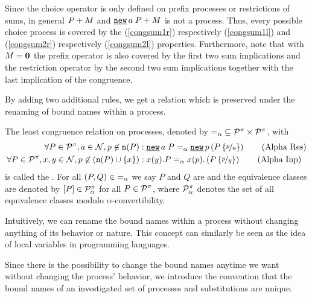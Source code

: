 Since the choice operator is only defined on prefix processes or restrictions of sums, in general $P + M$ and $\procchoice{\procres{a}{P}}{M}$ is not a process. Thus, every possible choice process is covered by the (\ref{congsum1r}) respectively (\ref{congsum1l}) and (\ref{congsum2r}) respectively (\ref{congsum2l}) properties. Furthermore, note that with $M=\mathbf{0}{}$ the prefix operator is also covered by the first two sum implications and the restriction operator by the second two sum implications together with the last implication of the congruence.

By adding two additional rules, we get a relation which is preserved under the renaming of bound names within a process.

\begin{definition}
\label{def_alpha_conv}
The least congruence relation on processes, denoted by $=_\alpha\;\subseteq\mathcal P^{\pi}\times\mathcal P^{\pi}$, with
	\begin{align}
		\forall P\in\procs,a\in\names{},p\nin\n{P}&: \procres{a}{P}\alphaeq{}\procres[a]{p}{P\subs{p}{a}} \tag{Alpha Res} \\
		\forall P\in\procs,x,y\in\names{},p\nin\left(\n{P}\cup\set{x}\right)&: \inp{x}{y}.P\alphaeq{}\inp{x}{p}.\left(P\subs{p}{y}\right) \tag{Alpha Inp} 
	\end{align}
is called the . For all $(P,Q)\in\;=_\alpha$ we say $P$ and $Q$ are  and the equivalence classes are denoted by $\left[P\right]\in\mathcal P^{\pi}_\alpha$ for all $P\in\mathcal P^{\pi}$, where $\mathcal P^{\pi}_\alpha$ denotes the set of all equivalence classes modulo $\alpha$-convertibility.
\end{definition}

Intuitively, we can rename the bound names within a process without changing anything of its behavior or nature. This concept can similarly be seen as the idea of local variables in programming languages. %

Since there is the possibility to change the bound names anytime we want without changing the process' behavior, we introduce the convention that the bound names of an investigated set of processes and substitutions are unique.%

